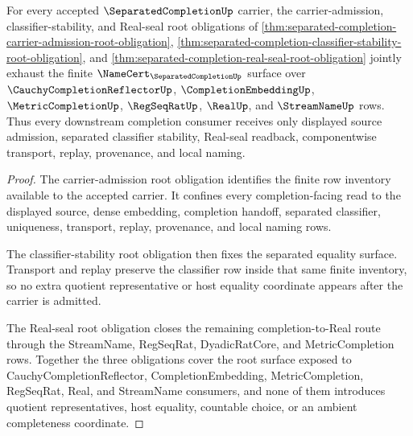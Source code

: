 \begin{theorem}
\label{thm:separated-completion-root-obligation-package}
For every accepted $\SeparatedCompletionUp$ carrier, the carrier-admission, classifier-stability, and Real-seal root obligations of \autoref{thm:separated-completion-carrier-admission-root-obligation}, \autoref{thm:separated-completion-classifier-stability-root-obligation}, and \autoref{thm:separated-completion-real-seal-root-obligation} jointly exhaust the finite $\NameCert_{\SeparatedCompletionUp}$ surface over $\CauchyCompletionReflectorUp$, $\CompletionEmbeddingUp$, $\MetricCompletionUp$, $\RegSeqRatUp$, $\RealUp$, and $\StreamNameUp$ rows. Thus every downstream completion consumer receives only displayed source admission, separated classifier stability, Real-seal readback, componentwise transport, replay, provenance, and local naming.
\end{theorem}
\begin{proof}
The carrier-admission root obligation identifies the finite row inventory available to the accepted carrier. It confines every completion-facing read to the displayed source, dense embedding, completion handoff, separated classifier, uniqueness, transport, replay, provenance, and local naming rows.

The classifier-stability root obligation then fixes the separated equality surface. Transport and replay preserve the classifier row inside that same finite inventory, so no extra quotient representative or host equality coordinate appears after the carrier is admitted.

The Real-seal root obligation closes the remaining completion-to-Real route through the StreamName, RegSeqRat, DyadicRatCore, and MetricCompletion rows. Together the three obligations cover the root surface exposed to CauchyCompletionReflector, CompletionEmbedding, MetricCompletion, RegSeqRat, Real, and StreamName consumers, and none of them introduces quotient representatives, host equality, countable choice, or an ambient completeness coordinate.
\end{proof}

